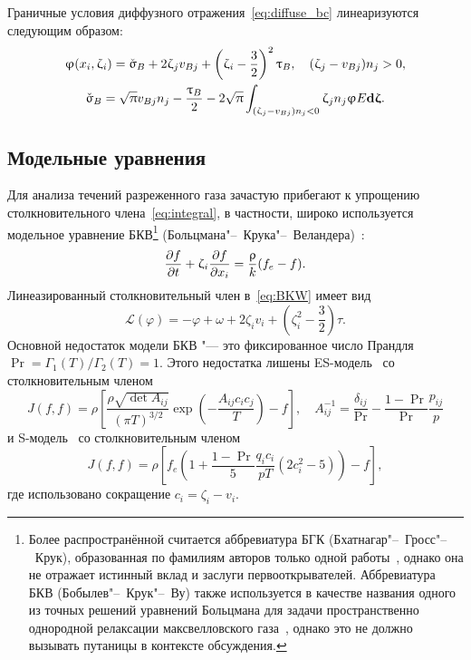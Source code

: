 Граничные условия диффузного отражения~\eqref{eq:diffuse_bc} линеаризуются следующим образом:
\begin{equation}\label{eq:linear_diffuse_bc}
    \begin{gathered}
        \varphi(x_i, \zeta_i) = \check\sigma_B + 2\zeta_j v_{Bj} + \left(\zeta_i-\frac32\right)^2\tau_B,
            \quad (\zeta_j-v_{Bj}) n_j > 0, \\
        \check\sigma_B = \sqrt\pi v_{Bj}n_j - \frac{\tau_B}2 -2\sqrt\pi
            \int_{(\zeta_j-v_{Bj})n_j < 0} \zeta_j n_j \varphi E\dzeta.
    \end{gathered}
\end{equation}

\subsection{Модельные уравнения}

Для анализа течений разреженного газа зачастую прибегают к упрощению
столкновительного члена~\eqref{eq:integral}, в частности, широко используется
модельное уравнение БКВ\footnote{
    Более распространённой считается аббревиатура БГК (Бхатнагар"--~Гросс"--~Крук),
    образованная по фамилиям авторов только одной работы~\cite{Krook1954},
    однако она не отражает истинный вклад и заслуги первооткрывателей.
    Аббревиатура БКВ (Бобылев"--~Крук"--~Ву) также используется в качестве названия одного из
    точных решений уравнений Больцмана для задачи пространственно однородной релаксации
    максвелловского газа~\cite{Bobylev1975, Krook1976},
    однако это не должно вызывать путаницы в контексте обсуждения.
} (Больцмана"--~Крука"--~Веландера)~\cite{Krook1954, Welander1954}:
\begin{equation}\label{eq:BKW}
    \pder[f]{t} + \zeta_i\pder[f]{x_i} = \frac{\rho}{k} (f_e-f).
\end{equation}
Линеазированный столкновительный член в~\eqref{eq:BKW} имеет вид
\begin{equation}\label{eq:BKW_integral}
    \mathcal{L}(\varphi) = -\varphi + \omega + 2\zeta_i v_i + \left( \zeta_i^2 - \frac32 \right)\tau.
\end{equation}
Основной недостаток модели БКВ "--- это фиксированное число Прандля \(\Pr = \Gamma_1(T)/\Gamma_2(T) = 1\).
Этого недостатка лишены ES-модель~\cite{Holway1966} со столкновительным членом
\begin{equation}\label{eq:ES_model}
    J(f,f) = \rho \left[\frac{\rho\sqrt{\det A_{ij}}}{(\pi T)^{3/2}}
        \exp\left(- \frac{A_{ij}c_i c_j}T \right) -f \right], \quad
    A_{ij}^{-1} = \frac{\delta_{ij}}{\Pr} - \frac{1-\Pr}{\Pr}\frac{p_{ij}}{p}
\end{equation}
и S-модель~\cite{Shakhov1968} со столкновительным членом
\begin{equation}\label{eq:S_model}
    J(f,f) = \rho \left[ f_e \left( 1+\frac{1-\Pr}{5}\frac{q_i c_i}{pT}
        \left(2c_i^2-5\right) \right)-f\right],
\end{equation}
где использовано сокращение \(c_i = \zeta_i-v_i\).

